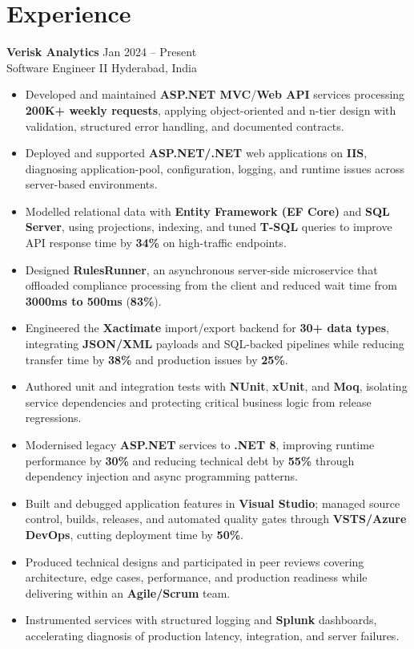 \documentclass[10pt,letterpaper]{article}
\newcommand{\resumeSubheading}[4]{%
  \textbf{#1} \hfill #2 \\
  #3 \hfill #4 \\
}
\begin{document}
\section*{Experience}
\resumeSubheading{Verisk Analytics}{Jan 2024 -- Present}{Software Engineer II}{Hyderabad, India}
\begin{itemize}
    \item Developed and maintained \textbf{ASP.NET MVC}/\textbf{Web API} services processing \textbf{200K+ weekly requests}, applying object-oriented and n-tier design with validation, structured error handling, and documented contracts.
    \item Deployed and supported \textbf{ASP.NET/.NET} web applications on \textbf{IIS}, diagnosing application-pool, configuration, logging, and runtime issues across server-based environments.
    \item Modelled relational data with \textbf{Entity Framework (EF Core)} and \textbf{SQL Server}, using projections, indexing, and tuned \textbf{T-SQL} queries to improve API response time by \textbf{34\%} on high-traffic endpoints.
    \item Designed \textbf{RulesRunner}, an asynchronous server-side microservice that offloaded compliance processing from the client and reduced wait time from \textbf{3000ms to 500ms} (\textbf{83\%}).
    \item Engineered the \textbf{Xactimate} import/export backend for \textbf{30+ data types}, integrating \textbf{JSON/XML} payloads and SQL-backed pipelines while reducing transfer time by \textbf{38\%} and production issues by \textbf{25\%}.
    \item Authored unit and integration tests with \textbf{NUnit}, \textbf{xUnit}, and \textbf{Moq}, isolating service dependencies and protecting critical business logic from release regressions.
    \item Modernised legacy \textbf{ASP.NET} services to \textbf{.NET 8}, improving runtime performance by \textbf{30\%} and reducing technical debt by \textbf{55\%} through dependency injection and async programming patterns.
    \item Built and debugged application features in \textbf{Visual Studio}; managed source control, builds, releases, and automated quality gates through \textbf{VSTS/Azure DevOps}, cutting deployment time by \textbf{50\%}.
    \item Produced technical designs and participated in peer reviews covering architecture, edge cases, performance, and production readiness while delivering within an \textbf{Agile/Scrum} team.
    \item Instrumented services with structured logging and \textbf{Splunk} dashboards, accelerating diagnosis of production latency, integration, and server failures.
\end{itemize}
\end{document}
